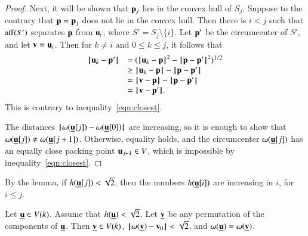\begin{proof}
%
  Next, it will be shown that ${\mathbf p}_j$ lies in the convex hull of $S_j$.
Suppose to the contrary that ${\mathbf p}={\mathbf p}_j$ does not lie in the convex hull. Then there is $i<j$ such that ${\operatorname{aff}}(S')$ separates ${\mathbf p}$ from $ {\mathbf u}_i$, where  $S'=S_j\setminus\{i\}$.  Let ${\mathbf p}'$ be the circumcenter of $S'$, and let ${\mathbf v}= {\mathbf u}_i$.  Then for $k\ne i$ and $0\le k\le j$, it follows that
$$
\begin{array}{lll}
\norm{ \u_k}{\p'} &= (\norm{ \u_k}{\p}^2 - \norm{\p}{\p'}^2)^{1/2} \\
  &\ge \norm{ \u_k}{\p} - \norm{\p}{\p'} \\
  &=\norm{\v}{\p} - \norm{\p}{\p'}\\
  &=\norm{\v}{\p'}.
\end{array}
$$
This is contrary to inequality~\ref{eqn:closest}.


  The distances ${\hskip0.1em|\hskip-0.15em|\hskip0.1em}\omega({\underline{{\mathbf u}}}[j]) - \omega({\underline{{\mathbf u}}}[0]){\hskip0.1em|\hskip-0.15em|\hskip0.1em}$ are increasing, so it is enough to show
that $\omega({\underline{{\mathbf u}}}[j])\ne \omega({\underline{{\mathbf u}}}[j+1])$.  Otherwise,   equality holds, and the circumcenter $\omega({\underline{{\mathbf u}}}[j])$
has an equally close packing point $ {\mathbf u}_{j+1}\in V$, which is impossible by inequality~\ref{eqn:closest}.
\end{proof}





By the lemma, if $h({\underline{{\mathbf u}}}[j])<\sqrt2$, then the numbers $h({\underline{{\mathbf u}}}[i])$ are increasing in $i$, for $i\le j$.


\begin{lemma}   
Let ${\underline{{\mathbf u}}}\in V(k)$.  Assume that $h({\underline{{\mathbf u}}})<\sqrt2$. Let ${\underline{{\mathbf v}}}$ be any permutation of the components of ${\underline{{\mathbf u}}}$.  
Then ${\underline{{\mathbf v}}}\in V(k)$, ${\hskip0.1em|\hskip-0.15em|\hskip0.1em}\omega({\underline{{\mathbf v}}}) - {\mathbf v}_0{\hskip0.1em|\hskip-0.15em|\hskip0.1em}<\sqrt2$, and  $\omega({\underline{{\mathbf u}}}) = \omega({\underline{{\mathbf v}}})$.
\end{lemma}

